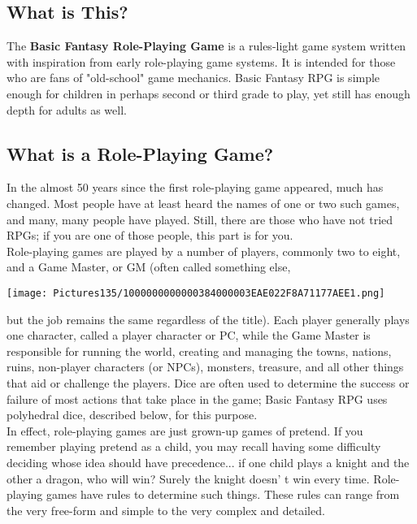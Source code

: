 \documentclass[a4paper,twoside,openany,10pt]{book}
\begin{document}
\begin{multicols}{2}

\subsection{What is This?}\label{what-is-this}

The \textbf{Basic Fantasy Role-Playing Game} is a rules-light game system written with inspiration from early role-playing game systems. It is intended for those who are fans of "old-school" game mechanics. Basic Fantasy RPG is simple enough for children in perhaps second or third
grade to play, yet still has enough depth for adults as well. 

\subsection{What is a Role-Playing Game?}\label{what-is-a-role-playing-game}

In the almost 50 years since the first role-playing game appeared, much has changed. Most people have at least heard the names of one or two such games, and many, many people have played. Still, there are those who have not tried RPGs; if you are one of those people, this part is for you.\\

Role-playing games are played by a number of players, commonly two to eight, and a Game Master, or GM (often called something else,

\texttt{[image: Pictures135/1000000000000384000003EAE022F8A71177AEE1.png]}

but the job remains the same regardless of the title). Each player generally plays one character, called a player character or PC, while the Game Master is responsible for running the world, creating and managing the towns, nations, ruins, non-player characters (or NPCs), monsters, treasure, and all other things that aid or challenge the players. Dice are often used to determine the success or failure of most actions that take place in the game; Basic Fantasy RPG uses polyhedral dice, described below, for this purpose.\\

In effect, role-playing games are just grown-up games of pretend. If you remember playing pretend as a child, you may recall having some difficulty deciding whose idea should have precedence... if one child plays a knight and the other a dragon, who will win? Surely the knight doesn' t win every time. Role-playing games have rules to determine such things. These rules can range from the very free-form and simple to the very complex and detailed.


\end{multicols}
\end{document}

